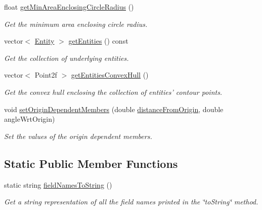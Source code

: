 \begin{DoxyCompactItemize}
float \hyperlink{classmultiscale_1_1analysis_1_1Cluster_aecf5fa56fa21e3b22130242694be744f}{get\-Min\-Area\-Enclosing\-Circle\-Radius} ()
\begin{DoxyCompactList}\small\item\em Get the minimum area enclosing circle radius. \end{DoxyCompactList}\item 
vector$<$ \hyperlink{classmultiscale_1_1analysis_1_1Entity}{Entity} $>$ \hyperlink{classmultiscale_1_1analysis_1_1Cluster_aedd64d46ad3ea61ce7bb76be1f0906e6}{get\-Entities} () const 
\begin{DoxyCompactList}\small\item\em Get the collection of underlying entities. \end{DoxyCompactList}\item 
vector$<$ Point2f $>$ \hyperlink{classmultiscale_1_1analysis_1_1Cluster_a9f43161c58d9e4a97f3a33807397b255}{get\-Entities\-Convex\-Hull} ()
\begin{DoxyCompactList}\small\item\em Get the convex hull enclosing the collection of entities' contour points. \end{DoxyCompactList}\item 
void \hyperlink{classmultiscale_1_1analysis_1_1Cluster_a84033ee8d583d9195abbf42d5d420915}{set\-Origin\-Dependent\-Members} (double \hyperlink{classmultiscale_1_1analysis_1_1SpatialCollection2D_ac2a5d3f8c2cb878c710d821c536b8a4f}{distance\-From\-Origin}, double angle\-Wrt\-Origin)
\begin{DoxyCompactList}\small\item\em Set the values of the origin dependent members. \end{DoxyCompactList}\end{DoxyCompactItemize}
\subsection*{Static Public Member Functions}
\begin{DoxyCompactItemize}
\item 
static string \hyperlink{classmultiscale_1_1analysis_1_1Cluster_a06984724ab3999d2bee36ce355dfe6bb}{field\-Names\-To\-String} ()
\begin{DoxyCompactList}\small\item\em Get a string representation of all the field names printed in the \char`\"{}to\-String\char`\"{} method. \end{DoxyCompactList}\end{DoxyCompactItemize}
